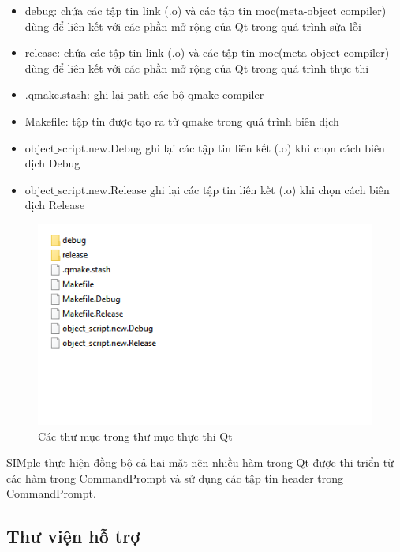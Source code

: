 \documentclass[12pt,a4paper]{report}
\begin{document}
            \begin{itemize}
                \item debug: chứa các tập tin link (.o) và các tập tin moc(meta-object compiler) dùng để liên kết với các phần mở rộng của Qt trong quá trình sửa lỗi
                \item release: chứa các tập tin link (.o) và các tập tin moc(meta-object compiler) dùng để liên kết với các phần mở rộng của Qt trong quá trình thực thi
                \item .qmake.stash: ghi lại path các bộ qmake compiler
                \item Makefile: tập tin được tạo ra từ qmake trong quá trình biên dịch
                \item object$\_$script.new.Debug ghi lại các tập tin liên kết (.o) khi chọn cách biên dịch Debug
                \item object$\_$script.new.Release ghi lại các tập tin liên kết (.o) khi chọn cách biên dịch Release
            \end{itemize}
            \begin{figure}[H]
                \centering

                \label{F:buildfolder}
                \includegraphics[scale = 1]{buildfolder.png}
                \caption{Các thư mục trong thư mục thực thi Qt}
            \end{figure}
        SIMple thực hiện đồng bộ cả hai mặt nên nhiều hàm trong Qt được thi triển từ các hàm trong CommandPrompt và sử dụng các tập tin header trong CommandPrompt.\\
        \subsection{Thư viện hỗ trợ}
\end{document}
